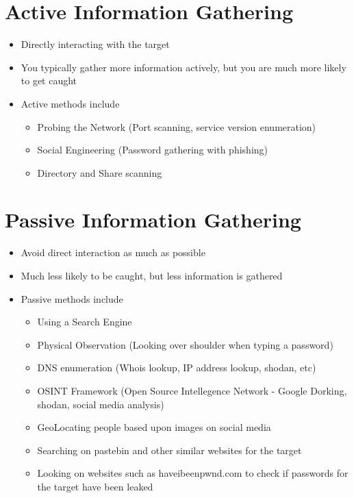 
\section*{Active Information Gathering}

\begin{itemize}
  \item Directly interacting with the target
  \item You typically gather more information actively, but you are much more likely to get caught
  \item Active methods include
  \begin{itemize}
    \item Probing the Network (Port scanning, service version enumeration)
    \item Social Engineering (Password gathering with phishing)
    \item Directory and Share scanning
  \end{itemize}
\end{itemize}

\section*{Passive Information Gathering}

\begin{itemize}
  \item Avoid direct interaction as much as possible
  \item Much less likely to be caught, but less information is gathered
  \item Passive methods include
  \begin{itemize}
    \item Using a Search Engine
    \item Physical Observation (Looking over shoulder when typing a password)
    \item DNS enumeration (Whois lookup, IP address lookup, shodan, etc)
    \item OSINT Framework (Open Source Intellegence Network - Google Dorking, shodan, social media analysis)
    \item GeoLocating people based upon images on social media
    \item Searching on pastebin and other similar websites for the target
    \item Looking on websites such as haveibeenpwnd.com to check if passwords for the target have been leaked
  \end{itemize}
\end{itemize}